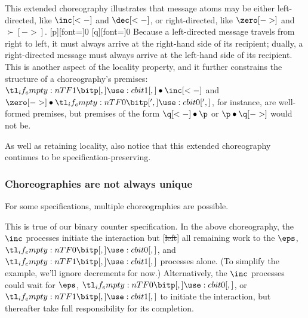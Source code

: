This extended choreography illustrates that message atoms may be either left-directed, like $\inc[<-]$ and $\dec[<-]$, or right-directed, like $\zero[->]$ and $\succ[->]$.
% 
\NewPredicate{\p}[p][font=\mathit]{0}%
\NewPredicate{\q}[q][font=\mathit]{0}%
Because a left-directed message travels from right to left, it must always arrive at the right-hand side of its recipient; dually, a right-directed message must always arrive at the left-hand side of its recipient.
This is another aspect of the locality property, and it further constrains the structure of a choreography's premises: $\bit{1} \fuse \inc[<-]$ and $\zero[->] \fuse \bit[']{0}$, for instance, are well-formed premises, but premises of the form $\q[<-] \fuse \p$ or $\p \fuse \q[->]$ would not be.

As well as retaining locality, also notice that this extended choreography continues to be specification-preserving.


\subsubsection{Choreographies are not always unique}\label{sec:mult-chor-are}

For some specifications, multiple choreographies are possible.

This is true of our binary counter specification.
%
In the above choreography,
the $\inc$ processes initiate the interaction but [\st{left}] all remaining work to the $\eps$, $\bit{0}$, and $\bit{1}$ processes alone.
(To simplify the example, we'll ignore decrements for now.)
Alternatively, the $\inc$ processes could wait for $\eps$, $\bit{0}$, or $\bit{1}$ to initiate the interaction, but thereafter take full responsibility for its completion.


